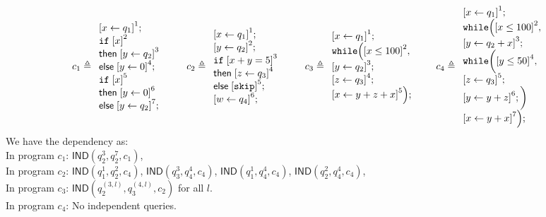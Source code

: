 \documentclass[a4paper,11pt]{article}
\begin{document}
\[
c_1 \triangleq
\begin{array}{l}
     \left[x \leftarrow q_1 \right]^1; \\
    \eif \; \left[x \right]^2\; \\
    \mathsf{then} \; \left[y \leftarrow q_2 \right]^3\; \\
    \mathsf{else} \; \left[y \leftarrow 0 \right]^4; \\
    \eif \; \left[x \right]^5\; \\
    \mathsf{then} \; \left[ y \leftarrow 0 \right]^6\; \\
    \mathsf{else} \; \left[y \leftarrow q_2 \right]^7; \\
\end{array}
%
%
\hspace{20pt}
%
c_2 \triangleq
\begin{array}{l}
   \left[ x \leftarrow q_1 \right]^1; \\
   \left[y \leftarrow q_2\right]^2 ; \\
    \eif \;\left[ x + y = 5 \right]^3\; \\
    \mathsf{then} \;\left[ z \leftarrow q_3\right]^4 \; \\
    \mathsf{else} \;\left[ \eskip\right]^5 ; \\
   \left[ w \leftarrow q_4 \right]^6; \\
\end{array}
\hspace{20pt}
%
c_3 \triangleq
\begin{array}{l}
     \left[x \leftarrow q_1 \right]^1 ; \\
    \ewhile \Big( 
    \left[x \leq 100 \right]^2 , \\
    \left[y \leftarrow q_2 \right]^3; \\
    \left[z \leftarrow q_3 \right]^4; \\
    \left[x \leftarrow y + z + x \right]^5
    \Big) ;
\end{array}
%
\hspace{20pt}
%
c_4 \triangleq
\begin{array}{l}
     \left[x \leftarrow q_1 \right]^1 ; \\
    \ewhile \Big( 
    \left[x \leq 100 \right]^2 , \\
    \left[y \leftarrow q_2 + x \right]^3; \\
    \ewhile \bigg( 
     \left[y \leq 50 \right]^4 , \\
    \left[z \leftarrow q_3 \right]^5; \\
    \left[y \leftarrow y + z \right]^6;
    \bigg)\\
    \left[x \leftarrow y + x \right]^7
    \Big) ;
\end{array}
\]
We have the dependency as:
\\
In program $c_1$:
$\mathsf{IND}(q_2^3, q_2^7, c_1)$, 
\\
In program $c_2$:
$\mathsf{IND}(q_1^1, q_2^2, c_4)$,
$\mathsf{IND}(q_3^3, q_4^4, c_4)$,
$\mathsf{IND}(q_1^1, q_4^4, c_4)$,
$\mathsf{IND}(q_2^2, q_4^4, c_4)$,
\\
In program $c_3$: $\mathsf{IND}(q_2^{(3, l)}, q_3^{(4, l)}, c_2)$ for all $l$.
\\
In program $c_4$: No independent queries.
%
\end{document}
